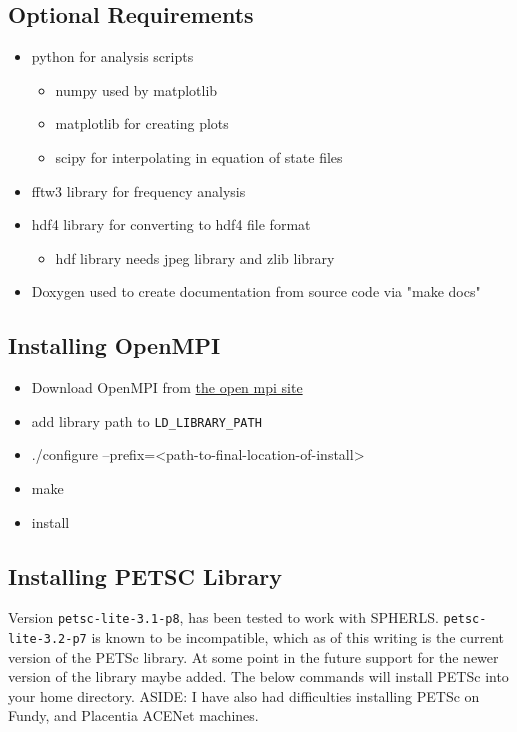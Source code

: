 \documentclass[11pt]{article}
\begin{document}
\subsection{Optional Requirements}
\begin{itemize}
\item python for analysis scripts
\begin{itemize}
\item numpy used by matplotlib
\item matplotlib for creating plots
\item scipy for interpolating in equation of state files
\end{itemize}
\item fftw3 library for frequency analysis
\item hdf4 library for converting to hdf4 file format
\begin{itemize}
\item hdf library needs jpeg library and zlib library
\end{itemize}
\item Doxygen used to create documentation from source code via "make docs"
\end{itemize}

\subsection{Installing OpenMPI}
\begin{itemize}
\item Download OpenMPI from \href{http://www.open-mpi.org/software/ompi/v1.6/}{the open mpi site}
\item add library path to {\tt LD\_LIBRARY\_PATH}
\item ./configure --prefix=<path-to-final-location-of-install>
\item make
\item install
\end{itemize}

\subsection{Installing PETSC Library}
Version {\tt petsc-lite-3.1-p8}, has been tested to work with SPHERLS. {\tt petsc-lite-3.2-p7} is known to be incompatible, which as of this writing is the current version of the PETSc library. At some point in the future support for the newer version of the library maybe added. The below commands will install PETSc into your home directory. ASIDE: I have also had difficulties installing PETSc on Fundy, and Placentia ACENet machines.
\end{document}
